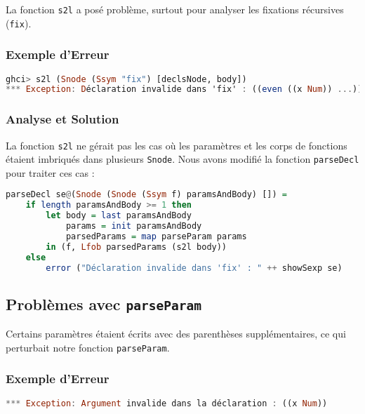 \documentclass[a4paper,12pt]{article}
\begin{document}
La fonction \texttt{s2l} a posé problème, surtout pour analyser les fixations récursives (\texttt{fix}).

\subsubsection{Exemple d'Erreur}

\begin{lstlisting}[language=Haskell, caption={Erreur rencontrée lors de l'utilisation de \texttt{s2l} avec \texttt{fix}}, label={lst:s2lFixError}]
ghci> s2l (Snode (Ssym "fix") [declsNode, body])
*** Exception: Déclaration invalide dans 'fix' : ((even ((x Num)) ...))
\end{lstlisting}

\subsubsection{Analyse et Solution}

La fonction \texttt{s2l} ne gérait pas les cas où les paramètres et les corps de fonctions étaient imbriqués dans plusieurs \texttt{Snode}. Nous avons modifié la fonction \texttt{parseDecl} pour traiter ces cas :

\begin{lstlisting}[language=Haskell, caption={Modification de la fonction \texttt{parseDecl}}, label={lst:parseDecl}]
parseDecl se@(Snode (Snode (Ssym f) paramsAndBody) []) =
    if length paramsAndBody >= 1 then
        let body = last paramsAndBody
            params = init paramsAndBody
            parsedParams = map parseParam params
        in (f, Lfob parsedParams (s2l body))
    else
        error ("Déclaration invalide dans 'fix' : " ++ showSexp se)
\end{lstlisting}

\subsection{Problèmes avec \texttt{parseParam}}

Certains paramètres étaient écrits avec des parenthèses supplémentaires, ce qui perturbait notre fonction \texttt{parseParam}.

\subsubsection{Exemple d'Erreur}

\begin{lstlisting}[language=Haskell, caption={Erreur rencontrée lors de l'utilisation de \texttt{parseParam}}, label={lst:parseParamError}]
*** Exception: Argument invalide dans la déclaration : ((x Num))
\end{lstlisting}
\end{document}
